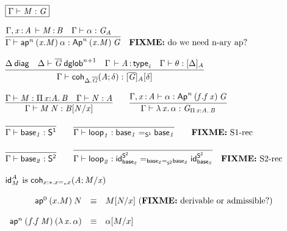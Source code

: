 \begin{small}
\[
\begin{array}{l}
\framebox{\ofglob{\Gamma}{M}{G}} \\ \\

\infer{\ofglob{\Gamma}{\apn{n}{(x.M)}{\alpha}}{\Apn{n}{(x.M)}{G}}}
      {\oftp{\Gamma,\tptm{x}{A}}{M}{B} &
       \ofglob{\Gamma}{\alpha}{G_A} &
      }
\quad
\text{\FIXME{do we need n-ary ap?}}
\\ \\

\infer{\ofglob{\Gamma}{\coh{\ctx{\Delta}.\diag{G}}{A}{\delta}}{\tsubst{\interpdiag{\diag{G}}{A}}{\delta}}}
      {\wfdiag{\Delta} &
       \wfdglob{\Delta}{\diag G}{n+1} &
       \oftp{\Gamma}{A}{\typ{i}} &
       \wfsub{\Gamma}{\theta}{\interpdiag{\Delta}{A}}
      }
\\ \\

\infer{\ofglob{\Gamma}{\app{M}{N}}{\subst{B}{N}{x}}}
      {\ofglob{\Gamma}{M}{\picl{x}{A}{B}} &
        \ofglob{\Gamma}{N}{A}}
\qquad
\infer{\ofglob{\Gamma}{\ulam{x}{\alpha}}{G_{\picl{x}{A}{B}}}}
      {\ofglob{\Gamma,\tptm{x}{A}}{\alpha}{\Apn{n}{(f.\app{f}{x})}{G}}}
\\ \\

\infer{\ofglob{\Gamma}{\base{1}}{\dsd{S^1}}}{}
\qquad
\infer{\ofglob{\Gamma}{\lp{1}}{\homj{\dsd{S^1}}{\base{1}}{\base{1}}}}
      {}
\qquad
\text{\FIXME{S1-rec}}
\\ \\
\infer{\ofglob{\Gamma}{\base{2}}{\dsd{S^2}}}{}
\qquad
\infer{\ofglob{\Gamma}{\lp{2}}{\homj{\homj{\dsd{S^2}}{\base{2}}{\base{2}}}{\idt{\dsd{S^2}}{\base{2}}}{\idt{\dsd{S^2}}{\base{2}}}}}
      {} 
\quad
\text{\FIXME{S2-rec}}
\\ \\
\text{\idt{A}{M} is \coh{x:\diagbase.\homj{\diagbase}{x}{x}}{A}{M/x}} 

\\ \\
\begin{array}{rcl}
\apn{0}{(x.M)}{N} & \equiv & \subst{M}{N}{x} \text{ (\FIXME{derivable or admissible?})} \\ \\

\apn{n}{(f.\app f M)}{(\ulam{x}{\alpha})} & \equiv & \tsubst{\alpha}{M/x} \\


\end{array}
\end{array}\]
\end{small}
